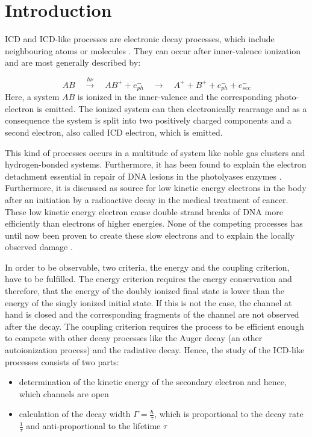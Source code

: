 \chapter{Introduction}
\ac{ICD} and \ac{ICD}-like processes are electronic decay processes,
which include neighbouring atoms or molecules \cite{Cederbaum97}.
They can occur after inner-valence ionization and
are most generally described by:

\begin{equation*}
 AB \quad \xrightarrow{h\nu}\quad AB^+ + e^-_{ph} \quad
    \rightarrow \quad A^+ + B^+ + e^-_{ph} + e^-_{sec}
\end{equation*}
Here, a system $AB$ is ionized in the inner-valence and the corresponding
photo-electron is emitted. The ionized system can then electronically
rearrange and as a consequence the system is split into two positively
charged components and a second electron, also called ICD electron, which is
emitted.

This kind of processes occurs in a multitude of system like noble gas clusters
and hydrogen-bonded systems. Furthermore, it has been found to explain
the electron detachment essential in repair of DNA lesions in the
photolyases enzymes \cite{Harbach13}. Furthermore, it is discussed as
source for low kinetic energy electrons in the body after an initiation
by a radioactive decay in the medical treatment of cancer. These low kinetic
energy electron cause
double strand breaks of DNA more efficiently than electrons of higher energies.
None of the competing processes has until now been proven to create these slow
electrons and to explain the locally observed damage \cite{}.

In order to be observable, two criteria, the energy and the coupling criterion,
have to be fulfilled. The energy criterion requires the energy conservation
and therefore, that the energy of the doubly ionized final state is lower than
the energy of the singly ionized initial state. If this is not the case, the
channel at hand is closed and the corresponding fragments of the
channel are not observed after the decay.
The coupling criterion requires the process to be efficient enough to compete
with other decay processes like the Auger decay (an other autoionization
process) and the radiative decay.
Hence, the study of the \ac{ICD}-like processes consists of two parts:
\begin{itemize}
 \item determination of the kinetic energy of the secondary electron
       and hence, which channels are open
 \item calculation of the decay width $\Gamma=\frac{\hbar}{\tau}$, which
       is proportional to the decay rate $\frac{1}{\tau}$ and
       anti-proportional to the lifetime $\tau$
\end{itemize}

